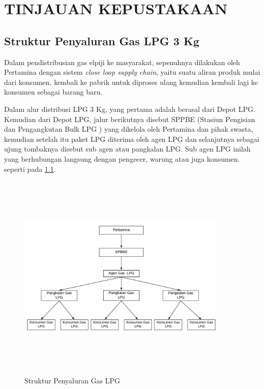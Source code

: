 
\chapter{TINJAUAN KEPUSTAKAAN}                

\section{Struktur Penyaluran Gas LPG 3 Kg}
\par Dalam pendistribusian gas elpiji ke masyarakat, sepenuhnya dilakukan oleh Pertamina dengan sistem \textit{close loop  supply chain}, yaitu suatu aliran produk mulai dari konsumen, kembali ke pabrik untuk diproses ulang kemudian kembali lagi ke konsumen sebagai barang baru.
\par Dalam alur distribusi LPG 3 Kg, yang pertama adalah berasal dari Depot LPG. Kemudian dari Depot LPG, jalur berikutnya disebut SPPBE (Stasiun Pengisian dan Pengangkutan Bulk LPG ) yang dikelola oleh Pertamina dan pihak swasta, kemudian setelah itu paket LPG diterima oleh agen LPG dan selanjutnya sebagai ujung tombaknya disebut sub agen atau pangkalan LPG. Sub agen LPG inilah yang berhubungan langsung dengan pengecer, warung atau juga konsumen. seperti pada \ref{penyaluran}.
\begin{figure}[H]
	\centering
	\includegraphics [width = 10cm, height= 10cm]{gambar/struktur-penyaluran}
	\caption{Struktur Penyaluran Gas LPG}
	\label{penyaluran}
\end{figure}


